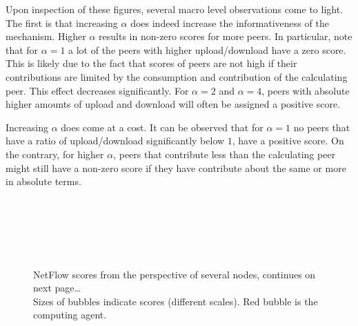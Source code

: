 \documentclass[a4paper,11pt]{book}
\theoremstyle{definition}
\begin{document}
Upon inspection of these figures, several macro level observations come to light. The first
is that increasing $\alpha$ does indeed increase the informativeness of the mechanism.
Higher $\alpha$ results in non-zero scores for more peers. In particular, note that
for $\alpha=1$ a lot of the peers with higher upload/download have a zero score. This is
likely due to the fact that scores of peers are not high if their contributions are limited
by the consumption and contribution of the calculating peer. This effect decreases
significantly. For $\alpha=2$ and $\alpha=4$, peers with absolute higher amounts of upload
and download will often be assigned a positive score. 

Increasing $\alpha$ does come at a cost. It can be observed that for $\alpha=1$ no peers
that have a ratio of upload/download significantly below $1$, have a positive score. 
On the contrary, for higher $\alpha$, peers that contribute less than the calculating
peer might still have a non-zero score if they have contribute about the same or more
in absolute terms.

\begin{figure}[ht]
    \centering
    \subfloat{}
    \subfloat{}\\
    \addtocounter{subfigure}{-1}
    \addtocounter{subfigure}{-1}

    \subfloat{}
    \subfloat{}\\

    \addtocounter{subfigure}{-1}
    \addtocounter{subfigure}{-1}

    \\
    \caption{NetFlow scores from the perspective of several nodes, continues on next page\dots \\
             Sizes of bubbles indicate scores (different scales). Red bubble is the computing agent.}
    \label{fig:nf_alpha_comparison_1}
\end{figure}
\end{document}
